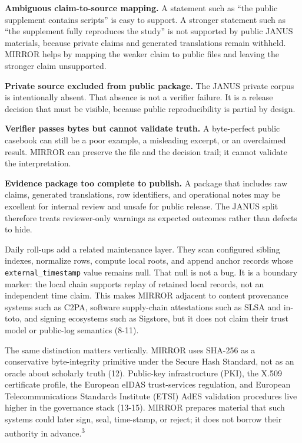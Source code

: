 \documentclass[10pt]{article}
\newcommand{\note}[1]{\textsuperscript{#1}}
\newcommand{\mirror}{MIRROR}
\begin{document}
\textbf{Ambiguous claim-to-source mapping.} A statement such as ``the public supplement contains scripts'' is easy to support. A stronger statement such as ``the supplement fully reproduces the study'' is not supported by public JANUS materials, because private claims and generated translations remain withheld. \mirror{} helps by mapping the weaker claim to public files and leaving the stronger claim unsupported.

\textbf{Private source excluded from public package.} The JANUS private corpus is intentionally absent. That absence is not a verifier failure. It is a release decision that must be visible, because public reproducibility is partial by design.

\textbf{Verifier passes bytes but cannot validate truth.} A byte-perfect public casebook can still be a poor example, a misleading excerpt, or an overclaimed result. \mirror{} can preserve the file and the decision trail; it cannot validate the interpretation.

\textbf{Evidence package too complete to publish.} A package that includes raw claims, generated translations, row identifiers, and operational notes may be excellent for internal review and unsafe for public release. The JANUS split therefore treats reviewer-only warnings as expected outcomes rather than defects to hide.

Daily roll-ups add a related maintenance layer. They scan configured sibling indexes, normalize rows, compute local roots, and append anchor records whose \texttt{external\_timestamp} value remains null. That null is not a bug. It is a boundary marker: the local chain supports replay of retained local records, not an independent time claim. This makes \mirror{} adjacent to content provenance systems such as C2PA, software supply-chain attestations such as SLSA and in-toto, and signing ecosystems such as Sigstore, but it does not claim their trust model or public-log semantics (8-11).

The same distinction matters vertically. \mirror{} uses SHA-256 as a conservative byte-integrity primitive under the Secure Hash Standard, not as an oracle about scholarly truth (12). Public-key infrastructure (PKI), the X.509 certificate profile, the European eIDAS trust-services regulation, and European Telecommunications Standards Institute (ETSI) AdES validation procedures live higher in the governance stack (13-15). \mirror{} prepares material that such systems could later sign, seal, time-stamp, or reject; it does not borrow their authority in advance.\note{3}
\end{document}
